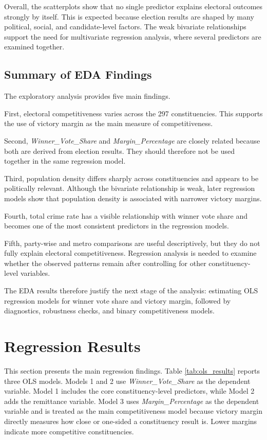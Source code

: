 \documentclass[12pt,a4paper]{article}
\begin{document}
Overall, the scatterplots show that no single predictor explains electoral outcomes strongly by itself. This is expected because election results are shaped by many political, social, and candidate-level factors. The weak bivariate relationships support the need for multivariate regression analysis, where several predictors are examined together.

\subsection{Summary of EDA Findings}

The exploratory analysis provides five main findings.

First, electoral competitiveness varies across the 297 constituencies. This supports the use of victory margin as the main measure of competitiveness.

Second, \textit{Winner\_Vote\_Share} and \textit{Margin\_Percentage} are closely related because both are derived from election results. They should therefore not be used together in the same regression model.

Third, population density differs sharply across constituencies and appears to be politically relevant. Although the bivariate relationship is weak, later regression models show that population density is associated with narrower victory margins.

Fourth, total crime rate has a visible relationship with winner vote share and becomes one of the most consistent predictors in the regression models.

Fifth, party-wise and metro comparisons are useful descriptively, but they do not fully explain electoral competitiveness. Regression analysis is needed to examine whether the observed patterns remain after controlling for other constituency-level variables.

The EDA results therefore justify the next stage of the analysis: estimating OLS regression models for winner vote share and victory margin, followed by diagnostics, robustness checks, and binary competitiveness models.

\section{Regression Results}

This section presents the main regression findings. Table \ref{tab:ols_results} reports three OLS models. Models 1 and 2 use \textit{Winner\_Vote\_Share} as the dependent variable. Model 1 includes the core constituency-level predictors, while Model 2 adds the remittance variable. Model 3 uses \textit{Margin\_Percentage} as the dependent variable and is treated as the main competitiveness model because victory margin directly measures how close or one-sided a constituency result is. Lower margins indicate more competitive constituencies.
\end{document}
